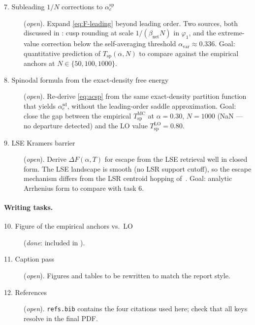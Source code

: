 \documentclass[11pt]{article}
\newcommand{\Bnet}{\beta_{\mathrm{net}}}
\newcommand{\acSd}{\alpha_c^{\mathrm{sd}}}
\newcommand{\acSp}{\alpha_c^{\mathrm{sp}}}
\newcommand{\Tsp}{T_{\mathrm{sp}}}
\begin{document}
\begin{description}

\item[7. Subleading $1/N$ corrections to $\acSp$]
(\emph{open}).
Expand \eqref{eq:F-leading} beyond leading order.  Two
sources, both discussed in : cusp rounding at
scale $1/(\Bnet N)$ in $\varphi_1$, and the extreme-value
correction below the self-averaging threshold $\alpha_{\mathrm{var}}
\approx 0.336$.  Goal: quantitative prediction of
$\Tsp(\alpha, N)$ to compare against the empirical anchors at
$N \in \{50, 100, 1000\}$.

\item[8. Spinodal formula from the exact-density free energy]
(\emph{open}).
Re-derive \eqref{eq:acsp} from the same exact-density partition
function that yields $\acSd$, without the leading-order
saddle approximation.  Goal: close the gap between the empirical
$\Tsp^{\mathrm{MC}}$ at $\alpha = 0.30$, $N = 1000$ (NaN — no
departure detected) and the LO value $\Tsp^{\mathrm{LO}} = 0.80$.

\item[9. LSE Kramers barrier]
(\emph{open}).
Derive $\Delta F(\alpha, T)$ for escape from the LSE
retrieval well in closed form.  The LSE landscape is smooth (no LSR
support cutoff), so the escape mechanism differs from the LSR centroid
hopping of~\citep{petrova2026metastable}.  Goal: analytic Arrhenius
form to compare with task 6.

\end{description}

\paragraph{Writing tasks.}

\begin{description}

\item[10. Figure of the empirical anchors vs.\ LO]
(\emph{done}: included in ).

\item[11. Caption pass]
(\emph{open}).  Figures and tables to be rewritten to match
the report style.

\item[12. References]
(\emph{open}).  \texttt{refs.bib} contains the four citations
used here; check that all keys resolve in the final PDF.

\end{description}
\end{document}
